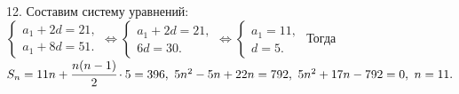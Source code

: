 12. Составим систему уравнений: $\begin{cases}a_1+2d=21,\\a_1+8d=51.\end{cases}\Leftrightarrow\begin{cases}a_1+2d=21,\\6d=30.\end{cases}
\Leftrightarrow\begin{cases}a_1=11,\\d=5.\end{cases}$ Тогда $S_n=11n+\cfrac{n(n-1)}{2}\cdot5=396,\ 5n^2-5n+22n=792,\ 5n^2+17n-792=0,\ n=11.$\\
